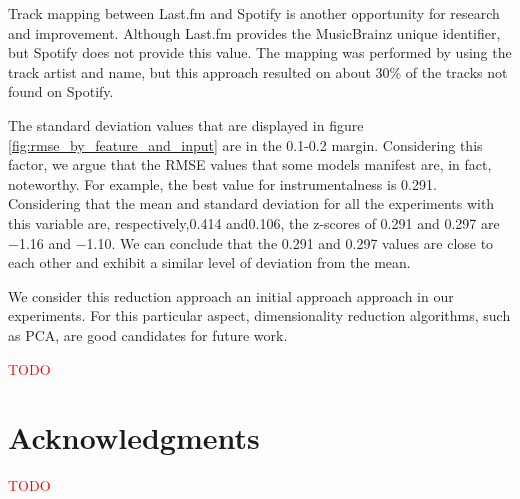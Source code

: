 \documentclass[sn-mathphys]{sn-jnl}%
\theoremstyle{thmstyleone}%
\theoremstyle{thmstyletwo}%
\theoremstyle{thmstylethree}%
\begin{document}
Track mapping between Last.fm and Spotify is another opportunity for research and improvement.
Although Last.fm provides the MusicBrainz unique identifier, but Spotify does not provide this value.
The mapping was performed by using the track artist and name, but this approach resulted on about 30\% of the tracks not found on Spotify.

The standard deviation values that are displayed in figure \ref{fig:rmse_by_feature_and_input} are in the 0.1-0.2 margin.
Considering this factor, we argue that the RMSE values that some models manifest are, in fact, noteworthy.
For example, the best value for instrumentalness is \num{0.291}.
Considering that the mean and standard deviation for all the experiments with this variable are, respectively,\num{0.414} and\num{0.106}, the z-scores
of \num{0.291} and \num{0.297} are \num{-1.16} and \num{-1.10}.
We can conclude that the \num{0.291} and \num{0.297} values are close to each other and exhibit a similar level of deviation from the mean.

We consider this reduction approach an initial approach approach in our experiments.
For this particular aspect, dimensionality reduction algorithms, such as PCA, are good candidates for future work.


\textcolor{red}{TODO}


\section{Acknowledgments}

\textcolor{red}{TODO}





\end{document}

